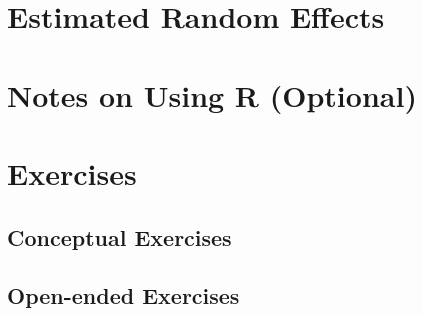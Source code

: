 \documentclass[
]{krantz}
\begin{document}
\hypertarget{estimatedRE}{%
\section{Estimated Random Effects}\label{estimatedRE}}

\hypertarget{usingR-glmm}{%
\section{Notes on Using R (Optional)}\label{usingR-glmm}}

\hypertarget{exercises-9}{%
\section{Exercises}\label{exercises-9}}

\hypertarget{conceptual-exercises-7}{%
\subsection{Conceptual Exercises}\label{conceptual-exercises-7}}

\hypertarget{open-ended-exercises-5}{%
\subsection{Open-ended Exercises}\label{open-ended-exercises-5}}

  

\backmatter
\printindex
\end{document}
